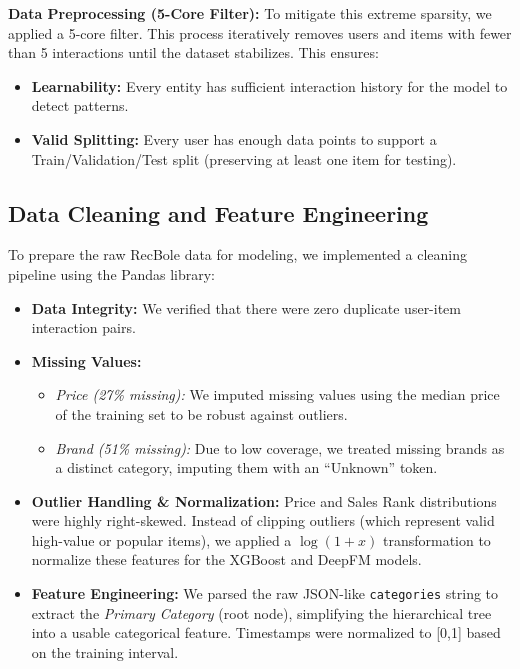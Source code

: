 \documentclass[twocolumn, 10pt, a4paper]{article}
\begin{document}
\textbf{Data Preprocessing (5-Core Filter):} 
To mitigate this extreme sparsity, we applied a 5-core filter. This process iteratively removes users and items with fewer than 5 interactions until the dataset stabilizes. This ensures:
\begin{itemize}[noitemsep]
    \item \textbf{Learnability:} Every entity has sufficient interaction history for the model to detect patterns.
    \item \textbf{Valid Splitting:} Every user has enough data points to support a Train/Validation/Test split (preserving at least one item for testing).
\end{itemize}

\subsection{Data Cleaning and Feature Engineering}
To prepare the raw RecBole data for modeling, we implemented a cleaning pipeline using the Pandas library:

\begin{itemize}
    \item \textbf{Data Integrity:} We verified that there were zero duplicate user-item interaction pairs.
    \item \textbf{Missing Values:}
    \begin{itemize}
        \item \textit{Price (27\% missing):} We imputed missing values using the median price of the training set to be robust against outliers.
        \item \textit{Brand (51\% missing):} Due to low coverage, we treated missing brands as a distinct category, imputing them with an ``Unknown'' token.
    \end{itemize}
    \item \textbf{Outlier Handling \& Normalization:} Price and Sales Rank distributions were highly right-skewed. Instead of clipping outliers (which represent valid high-value or popular items), we applied a $\log(1+x)$ transformation to normalize these features for the XGBoost and DeepFM models.
    \item \textbf{Feature Engineering:} We parsed the raw JSON-like \texttt{categories} string to extract the \textit{Primary Category} (root node), simplifying the hierarchical tree into a usable categorical feature. Timestamps were normalized to [0,1] based on the training interval.
\end{itemize}
\end{document}
